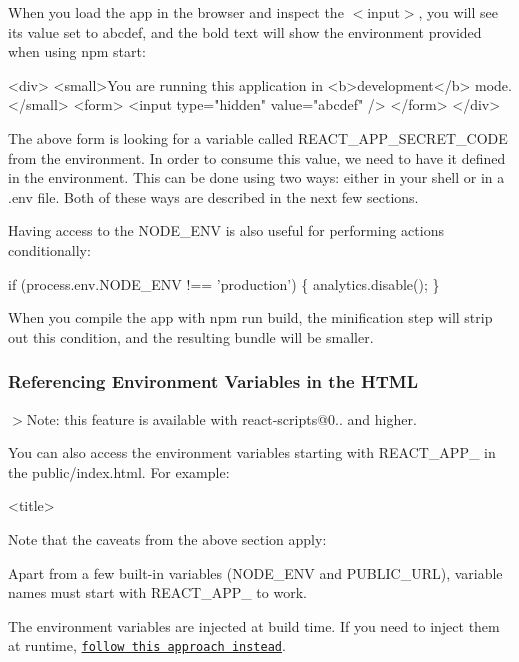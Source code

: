 When you load the app in the browser and inspect the {\ttfamily $<$input$>$}, you will see its value set to {\ttfamily abcdef}, and the bold text will show the environment provided when using {\ttfamily npm start}\+:


\begin{DoxyCode}
<div>
  <small>You are running this application in <b>development</b> mode.</small>
  <form>
    <input type="hidden" value="abcdef" />
  </form>
</div>
\end{DoxyCode}


The above form is looking for a variable called {\ttfamily R\+E\+A\+C\+T\+\_\+\+A\+P\+P\+\_\+\+S\+E\+C\+R\+E\+T\+\_\+\+C\+O\+DE} from the environment. In order to consume this value, we need to have it defined in the environment. This can be done using two ways\+: either in your shell or in a {\ttfamily .env} file. Both of these ways are described in the next few sections.

Having access to the {\ttfamily N\+O\+D\+E\+\_\+\+E\+NV} is also useful for performing actions conditionally\+:


\begin{DoxyCode}
if (process.env.NODE\_ENV !== 'production') \{
  analytics.disable();
\}
\end{DoxyCode}


When you compile the app with {\ttfamily npm run build}, the minification step will strip out this condition, and the resulting bundle will be smaller.

\subsubsection*{Referencing Environment Variables in the H\+T\+ML}

$>$Note\+: this feature is available with {\ttfamily react-\/scripts@0..} and higher.

You can also access the environment variables starting with {\ttfamily R\+E\+A\+C\+T\+\_\+\+A\+P\+P\+\_\+} in the {\ttfamily public/index.\+html}. For example\+:


\begin{DoxyCode}
<title>%
\end{DoxyCode}


Note that the caveats from the above section apply\+:


\begin{DoxyItemize}
\item Apart from a few built-\/in variables ({\ttfamily N\+O\+D\+E\+\_\+\+E\+NV} and {\ttfamily P\+U\+B\+L\+I\+C\+\_\+\+U\+RL}), variable names must start with {\ttfamily R\+E\+A\+C\+T\+\_\+\+A\+P\+P\+\_\+} to work.
\item The environment variables are injected at build time. If you need to inject them at runtime, \href{#generating-dynamic-meta-tags-on-the-server}{\tt follow this approach instead}.
\end{DoxyItemize}


